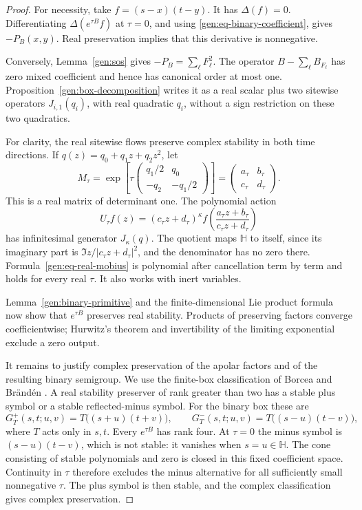 \documentclass[reqno]{amsart}
\theoremstyle{definition}
\theoremstyle{remark}
\newcommand{\HH}{\mathbb H}
\begin{document}
\begin{proof}
For necessity, take \(f=(s-x)(t-y)\).  It has \(\Delta(f)=0\).
Differentiating \(\Delta(e^{\tau B}f)\) at \(\tau=0\), and using
\eqref{gen:eq-binary-coefficient}, gives \(-P_B(x,y)\).
Real preservation implies that this derivative is nonnegative.

Conversely, Lemma~\ref{gen:sos} gives
\(-P_B=\sum_\ell F_\ell^2\).
The operator \(B-\sum_\ell B_{F_\ell}\) has zero mixed coefficient
and hence has canonical order at most one.
Proposition~\ref{gen:box-decomposition} writes it as a real scalar
plus two sitewise operators \(J_{i,1}(q_i)\), with real quadratic
\(q_i\), without a sign restriction on these two quadratics.

For clarity, the real sitewise flows preserve complex stability in
both time directions.  If \(q(z)=q_0+q_1z+q_2z^2\), let
\[
 M_\tau=\exp\left[
 \tau\begin{pmatrix}q_1/2&q_0\\-q_2&-q_1/2\end{pmatrix}
 \right]
 =\begin{pmatrix}a_\tau&b_\tau\\c_\tau&d_\tau\end{pmatrix}.
\]
This is a real matrix of determinant one.  The polynomial action
\begin{equation}
 U_\tau f(z)
 =(c_\tau z+d_\tau)^\kappa
 f\left(\frac{a_\tau z+b_\tau}{c_\tau z+d_\tau}\right)
 \label{gen:eq-real-mobius}
\end{equation}
has infinitesimal generator \(J_\kappa(q)\).
The quotient maps \(\HH\) to itself, since its imaginary part is
\(\Im z/|c_\tau z+d_\tau|^2\), and the denominator has no zero there.
Formula~\eqref{gen:eq-real-mobius} is polynomial after cancellation
term by term and holds for every real \(\tau\).
It also works with inert variables.

Lemma~\ref{gen:binary-primitive} and the finite-dimensional Lie
product formula now show that \(e^{\tau B}\) preserves real
stability.  Products of preserving factors converge coefficientwise;
Hurwitz's theorem and invertibility of the limiting exponential
exclude a zero output.

It remains to justify complex preservation of the apolar factors
and of the resulting binary semigroup.  We use the finite-box
classification of Borcea and Br\"and\'en
\cite[Theorems~1.1 and~1.2]{BB09}.
A real stability preserver of rank greater than two has a stable
plus symbol or a stable reflected-minus symbol.  For the binary
box these are
\[
 G_T^+(s,t;u,v)=T\bigl((s+u)(t+v)\bigr),\qquad
 G_T^-(s,t;u,v)=T\bigl((s-u)(t-v)\bigr),
\]
where \(T\) acts only in \(s,t\).
Every \(e^{\tau B}\) has rank four.
At \(\tau=0\) the minus symbol is \((s-u)(t-v)\), which is not
stable: it vanishes when \(s=u\in\HH\).
The cone consisting of stable polynomials and zero is closed
in this fixed coefficient space.  Continuity in \(\tau\) therefore
excludes the minus alternative for all sufficiently small
nonnegative \(\tau\).  The plus symbol is then stable, and the
complex classification gives complex preservation.


\end{proof}
\end{document}
